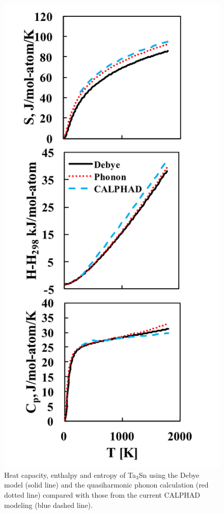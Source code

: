 \pagebreak
\begin{figure}[H]
	\centering
	\includegraphics[scale=1.0]{Chapter-4/Figures/Ta3Snfinitetemp.png}
	\caption{Heat capacity, enthalpy and entropy of Ta$_3$Sn using the Debye model (solid line) and the quasiharmonic phonon calculation (red dotted line) compared with those from the current CALPHAD modeling (blue dashed line).}
	\label{Ch4-figure:Ta3Snfinitetemp}
\end{figure}

